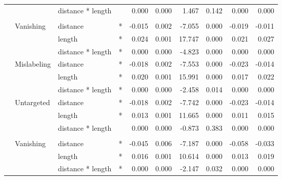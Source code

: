 \begin{longtable}[t]{llllrrrrrr}
\cmidrule{3-10}\nopagebreak
\hspace{1em} &  & distance * length &  & 0.000 & 0.000 & 1.467 & 0.142 & 0.000 & 0.000\\
\cmidrule{1-10}\pagebreak[0]
\addlinespace[0.3em]
\multicolumn{10}{l}{\textbf{SSD}}\\
\hspace{1em} & Vanishing & distance & * & -0.015 & 0.002 & -7.055 & 0.000 & -0.019 & -0.011\\
\cmidrule{3-10}\nopagebreak
\hspace{1em} &  & length & * & 0.024 & 0.001 & 17.747 & 0.000 & 0.021 & 0.027\\
\cmidrule{3-10}\nopagebreak
\hspace{1em} &  & distance * length & * & 0.000 & 0.000 & -4.823 & 0.000 & 0.000 & 0.000\\
\cmidrule{2-10}\nopagebreak
\hspace{1em} & Mislabeling & distance & * & -0.018 & 0.002 & -7.553 & 0.000 & -0.023 & -0.014\\
\cmidrule{3-10}\nopagebreak
\hspace{1em} &  & length & * & 0.020 & 0.001 & 15.991 & 0.000 & 0.017 & 0.022\\
\cmidrule{3-10}\nopagebreak
\hspace{1em} &  & distance * length & * & 0.000 & 0.000 & -2.458 & 0.014 & 0.000 & 0.000\\
\cmidrule{2-10}\nopagebreak
\hspace{1em} & Untargeted & distance & * & -0.018 & 0.002 & -7.742 & 0.000 & -0.023 & -0.014\\
\cmidrule{3-10}\nopagebreak
\hspace{1em} &  & length & * & 0.013 & 0.001 & 11.665 & 0.000 & 0.011 & 0.015\\
\cmidrule{3-10}\nopagebreak
\hspace{1em} &  & distance * length &  & 0.000 & 0.000 & -0.873 & 0.383 & 0.000 & 0.000\\
\cmidrule{1-10}\pagebreak[0]
\addlinespace[0.3em]
\multicolumn{10}{l}{\textbf{RetinaNet}}\\
\hspace{1em} & Vanishing & distance & * & -0.045 & 0.006 & -7.187 & 0.000 & -0.058 & -0.033\\
\cmidrule{3-10}\nopagebreak
\hspace{1em} &  & length & * & 0.016 & 0.001 & 10.614 & 0.000 & 0.013 & 0.019\\
\cmidrule{3-10}\nopagebreak
\hspace{1em} &  & distance * length & * & 0.000 & 0.000 & -2.147 & 0.032 & 0.000 & 0.000\\

\end{longtable}
